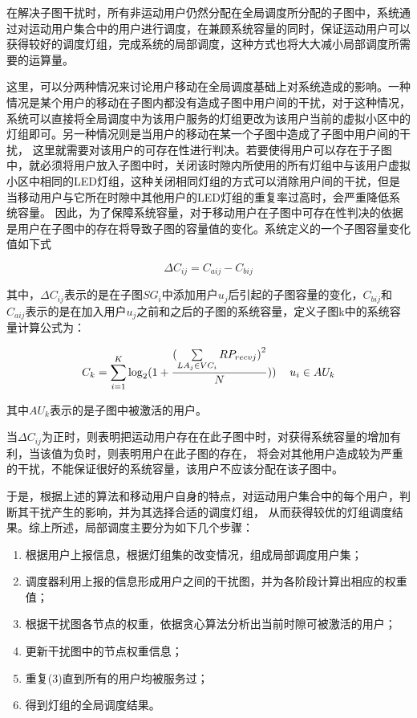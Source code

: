 在解决子图干扰时，所有非运动用户仍然分配在全局调度所分配的子图中，系统通过对运动用户集合中的用户进行调度，在兼顾系统容量的同时，保证运动用户可以获得较好的调度灯组，完成系统的局部调度，这种方式也将大大减小局部调度所需要的运算量。

这里，可以分两种情况来讨论用户移动在全局调度基础上对系统造成的影响。一种情况是某个用户的移动在子图内都没有造成子图中用户间的干扰，对于这种情况，系统可以直接将全局调度中为该用户服务的灯组更改为该用户当前的虚拟小区中的灯组即可。另一种情况则是当用户的移动在某一个子图中造成了子图中用户间的干扰，
这里就需要对该用户的可存在性进行判决。若要使得用户可以存在于子图中，就必须将用户放入子图中时，关闭该时隙内所使用的所有灯组中与该用户虚拟小区中相同的LED灯组，这种关闭相同灯组的方式可以消除用户间的干扰，但是当移动用户与它所在时隙中其他用户的LED灯组的重复率过高时，会严重降低系统容量。
因此，为了保障系统容量，对于移动用户在子图中可存在性判决的依据是用户在子图中的存在将导致子图的容量值的变化。系统定义的一个子图容量变化值如下式

\begin{equation}
    \Delta {C_{ij}} = {C_{aij}} - {C_{bij}}
\end{equation}

其中，$\Delta {C_{ij}}$表示的是在子图$SG_{i}$中添加用户$u_{j}$后引起的子图容量的变化，$C_{bij}$和$C_{aij}$表示的是在加入用户$u_{j}$之前和之后的子图的系统容量，定义子图k中的系统容量计算公式为：

\begin{equation}
    {C_k} = \sum\limits_{i = 1}^K {{{\log }_2}(1 + \frac{{{{(\sum\limits_{L{A_j} \in V{C_i}} {R{P_{recvj}}} )}^2}}}{N}))} {\kern 1pt} {\kern 1pt} {\kern 1pt} {\kern 1pt} {\kern 1pt} {\kern 1pt} {\kern 1pt} {\kern 1pt} {\kern 1pt} {\kern 1pt} {\kern 1pt} {\kern 1pt} {u_i} \in A{U_k}
\end{equation}

其中$AU_{k}$表示的是子图中被激活的用户。

当$\Delta {C_{ij}}$为正时，则表明把运动用户存在在此子图中时，对获得系统容量的增加有利，当该值为负时，则表明用户在此子图的存在，
将会对其他用户造成较为严重的干扰，不能保证很好的系统容量，该用户不应该分配在该子图中。

于是，根据上述的算法和移动用户自身的特点，对运动用户集合中的每个用户，判断其干扰产生的影响，并为其选择合适的调度灯组，
从而获得较优的灯组调度结果。综上所述，局部调度主要分为如下几个步骤：

\begin{enumerate}
    \item 根据用户上报信息，根据灯组集的改变情况，组成局部调度用户集；
    \item 调度器利用上报的信息形成用户之间的干扰图，并为各阶段计算出相应的权重值；
    \item 根据干扰图各节点的权重，依据贪心算法分析出当前时隙可被激活的用户；
    \item 更新干扰图中的节点权重信息；
    \item 重复(3)直到所有的用户均被服务过；
    \item 得到灯组的全局调度结果。
\end{enumerate}


